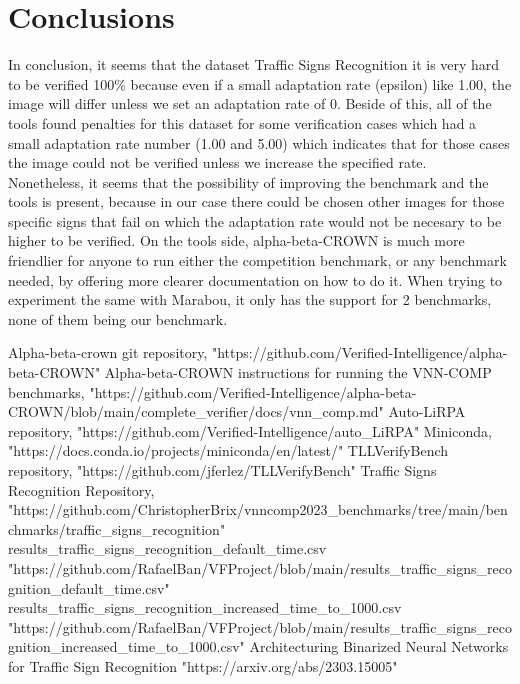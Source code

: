 \documentclass[12pt,a4paper]{report}
\newcommand\tab[1][5mm]{\hspace*{#1}}
\begin{document}
\chapter{Conclusions}
\tab In conclusion, it seems that the dataset Traffic Signs Recognition\cite{traffic_signs_recognition} it is very hard to be verified 100\% because even if a small adaptation rate (epsilon) like 1.00, the image will differ unless we set an adaptation rate of 0. Beside of this, all of the tools found penalties for this dataset for some verification cases which had a small adaptation rate number (1.00 and 5.00) which indicates that for those cases the image could not be verified unless we increase the specified rate.\\
\tab Nonetheless, it seems that the possibility of improving the benchmark and the tools is present, because in our case there could be chosen other images for those specific signs that fail on which the adaptation rate would not be necesary to be higher to be verified. On the tools side, alpha-beta-CROWN is much more friendlier for anyone to run either the competition benchmark, or any benchmark needed, by offering more clearer documentation on how to do it. When trying to experiment the same with Marabou, it only has the support for 2 benchmarks, none of them being our benchmark.

\begin{thebibliography}{1}
 Alpha-beta-crown git repository, "https://github.com/Verified-Intelligence/alpha-beta-CROWN"
 Alpha-beta-CROWN instructions for running the VNN-COMP benchmarks, "https://github.com/Verified-Intelligence/alpha-beta-CROWN/blob/main/complete\_verifier/docs/vnn\_comp.md"
 Auto-LiRPA repository, "https://github.com/Verified-Intelligence/auto\_LiRPA"
 Miniconda, "https://docs.conda.io/projects/miniconda/en/latest/"
 TLLVerifyBench repository, "https://github.com/jferlez/TLLVerifyBench"
 Traffic Signs Recognition Repository, "https://github.com/ChristopherBrix/vnncomp2023\_benchmarks/tree/main/benchmarks/traffic\_signs\_recognition"
 results\_traffic\_signs\_recognition\_default\_time.csv
"https://github.com/RafaelBan/VFProject/blob/main/results\_traffic\_signs\_recognition\_default\_time.csv"
 results\_traffic\_signs\_recognition\_increased\_time\_to\_1000.csv
"https://github.com/RafaelBan/VFProject/blob/main/results\_traffic\_signs\_recognition\_increased\_time\_to\_1000.csv"
Architecturing Binarized Neural Networks for Traffic Sign Recognition
"https://arxiv.org/abs/2303.15005"
\end{thebibliography}
\end{document}
